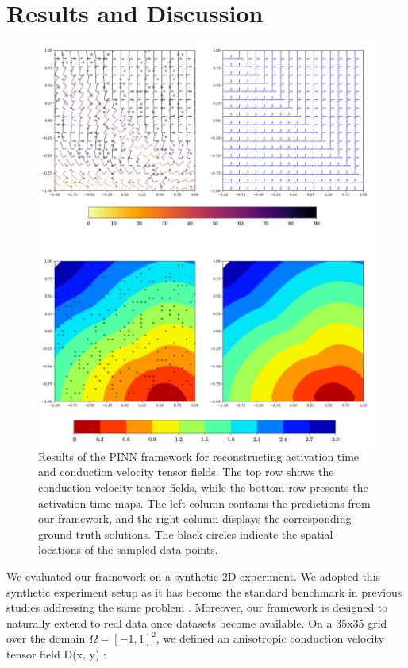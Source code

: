 \section{Results and Discussion}
\begin{figure}
    \centering
    \includegraphics[width=1\linewidth]{figures/results.png}
    \caption{Results of the PINN framework for reconstructing activation time and conduction velocity tensor fields. The top row shows the conduction velocity tensor fields, while the bottom row presents the activation time maps. The left column contains the predictions from our framework, and the right column displays the corresponding ground truth solutions. The black circles indicate the spatial locations of the sampled data points.}
    \label{fig:results}
\end{figure}
We evaluated our framework on a synthetic 2D experiment. We adopted this synthetic experiment setup as it has become the standard benchmark in previous studies addressing the same problem \cite{Mase2010, coveney2020, Karoui2021, SahliCostabal2020}. Moreover, our framework is designed to naturally extend to real data once datasets become available. On a 35x35 grid over the domain $\Omega = [-1,1]^2$, we defined an anisotropic conduction velocity tensor field D(x, y) \cite{RuizHerrera2022}:

